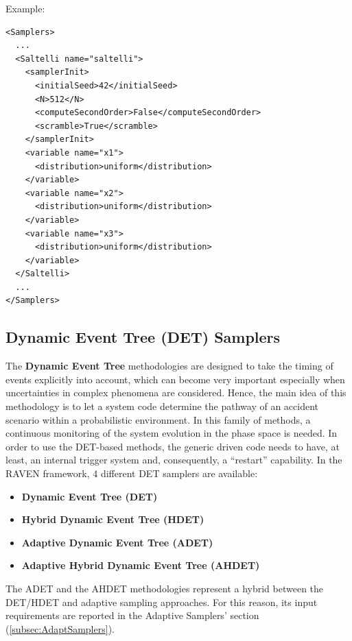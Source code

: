 Example:
\begin{lstlisting}[style=XML]
<Samplers>
  ...
  <Saltelli name="saltelli">
    <samplerInit>
      <initialSeed>42</initialSeed>
      <N>512</N>
      <computeSecondOrder>False</computeSecondOrder>
      <scramble>True</scramble>
    </samplerInit>
    <variable name="x1">
      <distribution>uniform</distribution>
    </variable>
    <variable name="x2">
      <distribution>uniform</distribution>
    </variable>
    <variable name="x3">
      <distribution>uniform</distribution>
    </variable>
  </Saltelli>
  ...
</Samplers>
\end{lstlisting}

\subsection{Dynamic Event Tree (DET) Samplers}
\label{subsec:DETSamplers}
The \textbf{Dynamic Event Tree} methodologies are designed to take the timing of
events explicitly into account, which can become very important especially when
uncertainties in complex phenomena are considered.
%
Hence, the main idea of this methodology is to let a system code determine the
pathway of an accident scenario within a probabilistic environment.
%
In this family of methods, a continuous monitoring of the system evolution in
the phase space is needed.
%
In order to use the DET-based methods, the generic driven code needs to have, at
least, an internal trigger system and, consequently, a ``restart'' capability.
%
In the RAVEN framework, 4 different DET samplers are available:
\begin{itemize}
\item \textbf{Dynamic Event Tree (DET)}
\item \textbf{Hybrid Dynamic Event Tree (HDET)}
\item \textbf{Adaptive Dynamic Event Tree (ADET)}
\item \textbf{Adaptive Hybrid Dynamic Event Tree (AHDET)}
\end{itemize}

The ADET and the AHDET methodologies represent a hybrid between the DET/HDET and adaptive sampling
approaches.
%
For this reason, its input requirements are reported in the Adaptive Samplers'
section (\ref{subsec:AdaptSamplers}).

